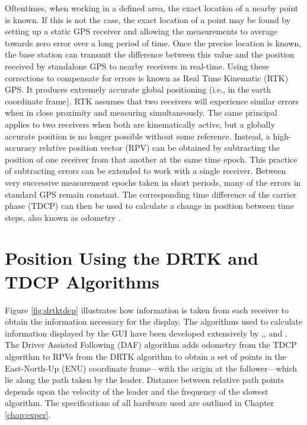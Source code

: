 \documentclass[12pt]{report}
\begin{document}
Oftentimes, when working in a defined area, the exact location of a nearby point is known. If this is not the case, the exact location of a point may be found by setting up a static GPS receiver and allowing the measurements to average towards zero error over a long period of time. Once the precise location is known, the base station can transmit the difference between this value and the position received by standalone GPS to nearby receivers in real-time. Using these corrections to compensate for errors is known as Real Time Kinematic (RTK) GPS. It produces extremely accurate global positioning (i.e., in the earth coordinate frame).
RTK assumes that two receivers will experience similar errors when in close proximity and measuring simultaneously. The same principal applies to two receivers when both are kinematically active, but a globally accurate position is no longer possible without some reference. Instead, a high-accuracy relative position vector (RPV) can be obtained by subtracting the position of one receiver from that another at the same time epoch.
This practice of subtracting errors can be extended to work with a single receiver. Between very successive measurement epochs taken in short periods, many of the errors in standard GPS remain constant. The corresponding time difference of the carrier phase (TDCP) can then be used to calculate a change in position between time steps, also known as odometry \cite{travisdiss}.


\section{Position Using the DRTK and TDCP Algorithms}
Figure \ref{fig:drtktdcp} illustrates how information is taken from each receiver to obtain the information necessary for the display. The algorithms used to calculate information displayed by the GUI have been developed extensively by \cite{scottthesis},\cite{travisshort}, \cite{travisconvoy} and \cite{travisdiss}. The Driver Assisted Following (DAF) algorithm adds odometry from the TDCP algorithm to RPVs from the DRTK algorithm to obtain a set of points in the East-North-Up (ENU) coordinate frame---with the origin at the follower---which lie along the path taken by the leader. Distance between relative path points depends upon the velocity of the leader and the frequency of the slowest algorithm. The specifications of all hardware used are outlined in Chapter \ref{chap:exper}.
\end{document}

